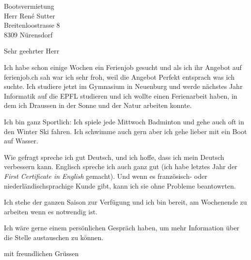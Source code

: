 \documentclass[10pt,a4paper]{letter}
\begin{document}
 
\begin{letter}{Bootsvermietung \\ Herr René Sutter \\ Breitenloostrasse 8 \\ 8309 Nürensdorf} 
\opening{Sehr geehrter Herr} 
 
Ich habe schon einige Wochen ein Ferienjob gesucht und als ich ihr Angebot auf ferienjob.ch sah war ich sehr froh, weil die Angebot Perfekt entsprach was ich suchte. Ich studiere jetzt im Gymnasium in Neuenburg und werde nächstes Jahr Informatik auf die EPFL studieren und ich wollte einen Ferienarbeit haben, in dem ich Draussen in der Sonne und der Natur arbeiten konnte.


Ich bin ganz Sportlich: Ich spiele jede Mittwoch Badminton und gehe auch oft in den Winter Ski fahren. Ich schwimme auch gern aber ich gehe lieber mit ein Boot auf Wasser. 


Wie gefragt spreche ich gut Deutsch, und ich hoffe, dass ich mein Deutsch verbessern kann. Englisch spreche ich auch ganz gut (ich habe letztes Jahr der \textit{First Certificate in English} gemacht). Und wenn es französisch- oder niederländischsprachige Kunde gibt, kann ich sie ohne Probleme beantowrten.


Ich stehe der ganzen Saison zur Verfügung und ich bin bereit, am Wochenende zu arbeiten wenn es notwendig ist.


Ich wäre gerne einem persönlichen Gespräch haben, um mehr Information über die Stelle austauschen zu können.

 
\closing{mit freundlichen Grüssen} 
\end{letter} 
\end{document}
